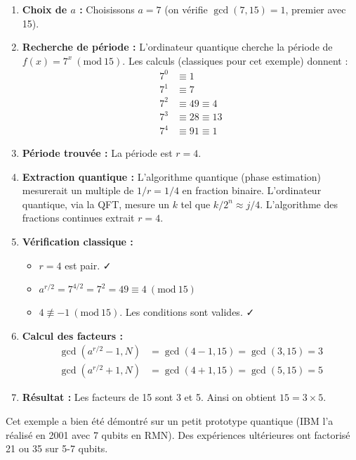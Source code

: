 \documentclass[11pt,a4paper]{article}
\newcommand{\Mod}[1]{\ (\mathrm{mod}\ #1)}
\begin{document}
\begin{enumerate}
\item \textbf{Choix de $a$ :} Choisissons $a = 7$ (on vérifie $\gcd(7, 15) = 1$, premier avec 15).

\item \textbf{Recherche de période :} L'ordinateur quantique cherche la période de $f(x) = 7^x \Mod{15}$. Les calculs (classiques pour cet exemple) donnent :
\begin{align*}
7^0 &\equiv 1\\
7^1 &\equiv 7\\
7^2 &\equiv 49 \equiv 4\\
7^3 &\equiv 28 \equiv 13\\
7^4 &\equiv 91 \equiv 1
\end{align*}

\item \textbf{Période trouvée :} La période est $r = 4$.

\item \textbf{Extraction quantique :} L'algorithme quantique (phase estimation) mesurerait un multiple de $1/r = 1/4$ en fraction binaire. L'ordinateur quantique, via la QFT, mesure un $k$ tel que $k/2^n \approx j/4$. L'algorithme des fractions continues extrait $r = 4$.

\item \textbf{Vérification classique :}
\begin{itemize}
\item $r = 4$ est pair. ✓
\item $a^{r/2} = 7^{4/2} = 7^2 = 49 \equiv 4 \Mod{15}$
\item $4 \not\equiv -1 \Mod{15}$. Les conditions sont valides. ✓
\end{itemize}

\item \textbf{Calcul des facteurs :}
\begin{align*}
\gcd(a^{r/2} - 1, N) &= \gcd(4 - 1, 15) = \gcd(3, 15) = 3\\
\gcd(a^{r/2} + 1, N) &= \gcd(4 + 1, 15) = \gcd(5, 15) = 5
\end{align*}

\item \textbf{Résultat :} Les facteurs de 15 sont 3 et 5. Ainsi on obtient $15 = 3 \times 5$.
\end{enumerate}

Cet exemple a bien été démontré sur un petit prototype quantique (IBM l'a réalisé en 2001 avec 7 qubits en RMN). Des expériences ultérieures ont factorisé 21 ou 35 sur 5-7 qubits.
\end{document}
